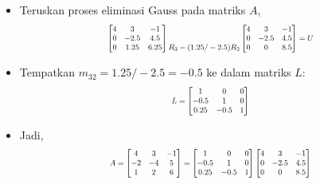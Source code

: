\documentclass[pdflatex,compress,mathserif]{beamer}
\newcommand*{\Scale}[2][4]{\scalebox{#1}{$#2$}}%
\begin{document}
\begin{frame}
	\begin{itemize}
		\item Teruskan proses eliminasi Gauss pada matriks $ A $,
		\[\Scale[0.7]{
		\begin{bmatrix}
			4 & 3 & -1 \\
			0 & -2.5 & 4.5 \\
			0 & 1.25 & 6.25 \\
		\end{bmatrix}
		\begin{matrix}
			\\\\R_3 - (1.25/-2.5)R_2
		\end{matrix}
		\begin{bmatrix}
			4 & 3 & -1 \\
			0 & -2.5 & 4.5 \\
			0 & 0 & 8.5 \\
		\end{bmatrix}
		=U
		}\]
		\item Tempatkan $ m_{32} = 1.25/-2.5 = -0.5 $ ke dalam matriks $ L $:
		\[\Scale[0.7]{ L = 
		\begin{bmatrix}
			1 & 0 & 0 \\
			-0.5 & 1 & 0 \\
			0.25 & -0.5 & 1 \\
		\end{bmatrix}
		}\]
		\item Jadi,
		\[\Scale[0.7]{ A = 
		\begin{bmatrix}
			4 & 3 & -1\\
			-2 & -4 & 5\\
			1 & 2 & 6\\
		\end{bmatrix} = 
		\begin{bmatrix}
			1 & 0 & 0 \\
			-0.5 & 1 & 0 \\
			0.25 & -0.5 & 1 \\
		\end{bmatrix}
		\begin{bmatrix}
		4 & 3 & -1 \\
		0 & -2.5 & 4.5 \\
		0 & 0 & 8.5 \\
		\end{bmatrix}
		}\]
	\end{itemize}
\end{frame}
\end{document}
